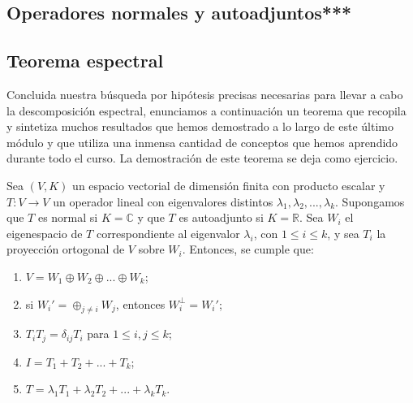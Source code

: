 \documentclass[12pt,dvipsnames]{article}
\newenvironment{teorema}[2][Teorema]{\begin{trivlist}
\item[\hskip \labelsep {\bfseries #1}\hskip \labelsep {\bfseries #2.}]}{\end{trivlist}}
\begin{document}
\subsection{Operadores normales y autoadjuntos***}

\subsection{Teorema espectral}

Concluida nuestra búsqueda por hipótesis precisas necesarias para llevar a cabo la descomposición espectral, enunciamos a continuación un teorema que recopila y sintetiza muchos resultados que hemos demostrado a lo largo de este último módulo y que utiliza una inmensa cantidad de conceptos que hemos aprendido durante todo el curso. La demostración de este teorema se deja como ejercicio.

\begin{teorema} {15.algo (Teorema espectral)}
Sea $(V,K)$ un espacio vectorial de dimensión finita con producto escalar y $T:V\to V$ un operador lineal con eigenvalores distintos $\lambda_1,\lambda_2,...,\lambda_k$. Supongamos que $T$ es normal si $K=\mathbb{C}$ y que $T$ es autoadjunto si $K=\mathbb{R}$. Sea $W_i$ el eigenespacio de $T$ correspondiente al eigenvalor $\lambda_i$, con $1\leq i\leq k$, y sea $T_i$ la proyección ortogonal de $V$ sobre $W_i$. Entonces, se cumple que:
\begin{enumerate}[label=\alph*)]
    \item $V = W_1 \oplus W_2 \oplus ... \oplus W_k$;
    \item si $W_i'=\oplus_{j\neq i}W_j$, entonces $W_i^\perp=W_i'$;
    \item $T_i T_j = \delta_{ij}T_i$ para $1\leq i,j\leq k$;
    \item $I = T_1+T_2+...+T_k$;
    \item $T = \lambda_1 T_1 + \lambda_2 T_2 + ... + \lambda_k T_k$.
\end{enumerate}


\end{teorema}
\end{document}
